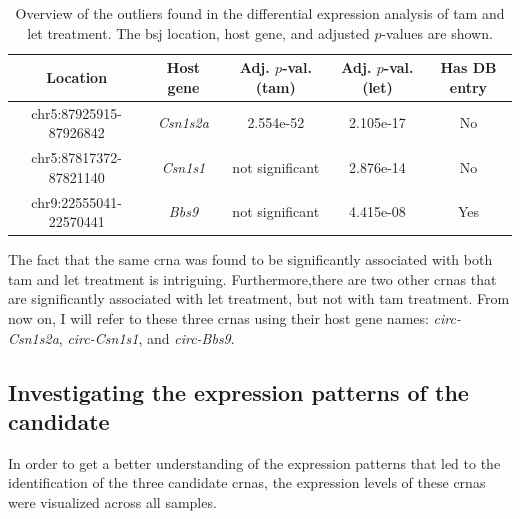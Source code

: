 \begin{table}[H] \centering \begin{tabular}{ccccc} \hline Location   &
               Host gene
                                         & Adj. $p$-val. (\gls{tam})
                                         &
               Adj. $p$-val. (\gls{let}) & Has DB entry
               \\ \hline
               chr5:87925915-87926842    & \textit{Csn1s2a}
                                         &
               2.554e-52
                                         & 2.105e-17
                                         & No
               \\
               chr5:87817372-87821140    & \textit{Csn1s1}
                                         & not
               significant               & 2.876e-14
                                         & No
               \\
               chr9:22555041-22570441    & \textit{Bbs9}
                                         & not
               significant               & 4.415e-08
                                         & Yes
               \\
               \hline
    \end{tabular} \caption{Overview of the outliers found in the differential
        expression analysis of \gls{tam} and \gls{let} treatment.
        The \gls{bsj} location, host gene, and adjusted $p$-values are shown.
    }
    \label{tab:outliers}
\end{table}

The fact that the same \gls{crna} was found to be significantly associated with
both \gls{tam} and \gls{let} treatment is intriguing.
Furthermore,there are two other \glspl{crna} that are significantly associated
with \gls{let} treatment, but not with \gls{tam} treatment.
From now on, I will refer to these three \glspl{crna} using their host gene
names: \textit{circ-Csn1s2a}, \textit{circ-Csn1s1}, and \textit{circ-Bbs9}.

\subsection{Investigating the expression patterns of the candidate
    }

In order to get a better understanding of the expression patterns that led to
the identification of the three candidate \glspl{crna}, the expression levels
of these \glspl{crna} were visualized across all samples.

